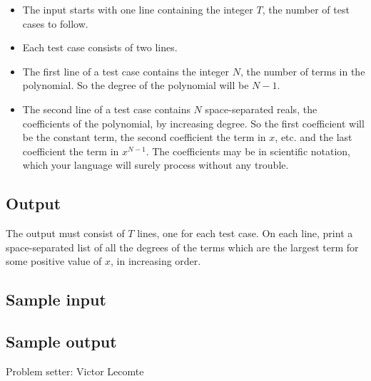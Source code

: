 \documentclass[a4paper,12pt]{article}
\begin{document}
\begin{itemize}
    \item The input starts with one line containing the integer $T$, the number of test cases to follow.
    \item Each test case consists of two lines.
    \item The first line of a test case contains the integer $N$, the number of terms in the polynomial. So the degree of the polynomial will be $N-1$.
    \item The second line of a test case contains $N$ space-separated reals, the coefficients of the polynomial, by increasing degree. So the first coefficient will be the constant term, the second coefficient the term in $x$, etc. and the last coefficient the term in $x^{N-1}$. The coefficients may be in scientific notation, which your language will surely process without any trouble.
\end{itemize}

\subsection*{Output}

The output must consist of $T$ lines, one for each test case.
On each line, print a space-separated list of all the degrees of the terms which are the largest term for some positive value of $x$, in increasing order.

\subsection*{Sample input}



\subsection*{Sample output}



\vspace{1em}
{\footnotesize Problem setter: Victor Lecomte}
\end{document}
